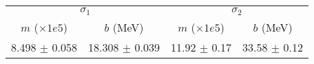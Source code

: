 \begin{tabular}{cc|cc}
\multicolumn{2}{c|}{$\sigma_1$} & \multicolumn{2}{|c}{$\sigma_2$} \\
$m$ ($\times1e5$) & $b$ (MeV) & $m$ ($\times1e5$) & $b$ (MeV) \\
\hline
8.498 $\pm$ 0.058 & 18.308 $\pm$ 0.039 & 11.92 $\pm$ 0.17 & 33.58 $\pm$ 0.12\\
\end{tabular}
